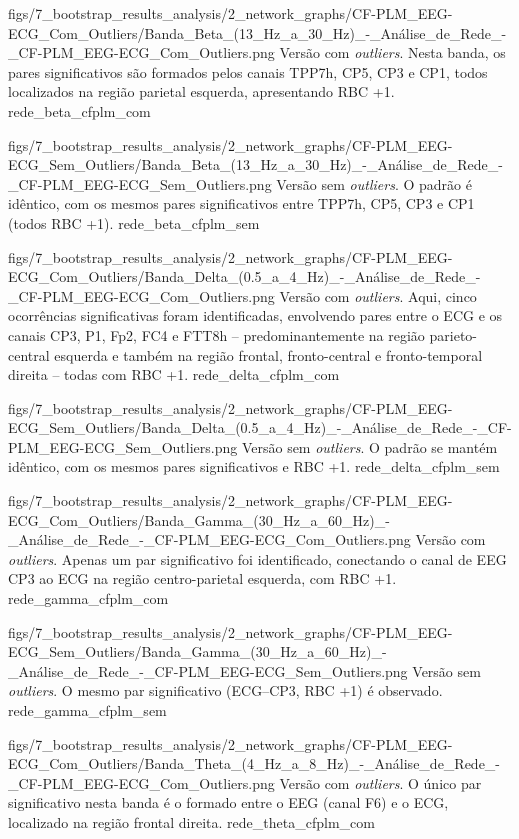 \smallfigure
{figs/7_bootstrap_results_analysis/2_network_graphs/CF-PLM_EEG-ECG_Com_Outliers/Banda_Beta_(13_Hz_a_30_Hz)_-_Análise_de_Rede_-_CF-PLM_EEG-ECG_Com_Outliers.png}
{Versão com \textit{outliers}. Nesta banda, os pares significativos são formados pelos canais TPP7h, CP5, CP3 e CP1, todos localizados na região parietal esquerda, apresentando RBC +1.}
{rede_beta_cfplm_com}

\smallfigure
{figs/7_bootstrap_results_analysis/2_network_graphs/CF-PLM_EEG-ECG_Sem_Outliers/Banda_Beta_(13_Hz_a_30_Hz)_-_Análise_de_Rede_-_CF-PLM_EEG-ECG_Sem_Outliers.png}
{Versão sem \textit{outliers}. O padrão é idêntico, com os mesmos pares significativos entre TPP7h, CP5, CP3 e CP1 (todos RBC +1).}
{rede_beta_cfplm_sem}

\smallfigure
{figs/7_bootstrap_results_analysis/2_network_graphs/CF-PLM_EEG-ECG_Com_Outliers/Banda_Delta_(0.5_a_4_Hz)_-_Análise_de_Rede_-_CF-PLM_EEG-ECG_Com_Outliers.png}
{Versão com \textit{outliers}. Aqui, cinco ocorrências significativas foram identificadas, envolvendo pares entre o ECG e os canais CP3, P1, Fp2, FC4 e FTT8h – predominantemente na região parieto-central esquerda e também na região frontal, fronto-central e fronto-temporal direita – todas com RBC +1.}
{rede_delta_cfplm_com}

\smallfigure
{figs/7_bootstrap_results_analysis/2_network_graphs/CF-PLM_EEG-ECG_Sem_Outliers/Banda_Delta_(0.5_a_4_Hz)_-_Análise_de_Rede_-_CF-PLM_EEG-ECG_Sem_Outliers.png}
{Versão sem \textit{outliers}. O padrão se mantém idêntico, com os mesmos pares significativos e RBC +1.}
{rede_delta_cfplm_sem}

\smallfigure
{figs/7_bootstrap_results_analysis/2_network_graphs/CF-PLM_EEG-ECG_Com_Outliers/Banda_Gamma_(30_Hz_a_60_Hz)_-_Análise_de_Rede_-_CF-PLM_EEG-ECG_Com_Outliers.png}
{Versão com \textit{outliers}. Apenas um par significativo foi identificado, conectando o canal de EEG CP3 ao ECG na região centro-parietal esquerda, com RBC +1.}
{rede_gamma_cfplm_com}

\smallfigure
{figs/7_bootstrap_results_analysis/2_network_graphs/CF-PLM_EEG-ECG_Sem_Outliers/Banda_Gamma_(30_Hz_a_60_Hz)_-_Análise_de_Rede_-_CF-PLM_EEG-ECG_Sem_Outliers.png}
{Versão sem \textit{outliers}. O mesmo par significativo (ECG–CP3, RBC +1) é observado.}
{rede_gamma_cfplm_sem}

\smallfigure
{figs/7_bootstrap_results_analysis/2_network_graphs/CF-PLM_EEG-ECG_Com_Outliers/Banda_Theta_(4_Hz_a_8_Hz)_-_Análise_de_Rede_-_CF-PLM_EEG-ECG_Com_Outliers.png}
{Versão com \textit{outliers}. O único par significativo nesta banda é o formado entre o EEG (canal F6) e o ECG, localizado na região frontal direita.}
{rede_theta_cfplm_com}

